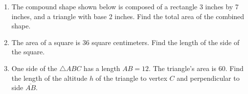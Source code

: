 \documentclass[12pt, twoside]{article}
\begin{document}
\begin{enumerate}
\item The compound shape shown below is composed of a rectangle 3 inches by 7 inches, and a triangle with base 2 inches. Find the total area of the combined shape.
    \vspace{0.5cm} 
    \begin{flushleft}
    \end{flushleft}
        
  \item The area of a square is 36 square centimeters. Find the length of the side of the square. \vspace{3cm}


  \item One side of the $\triangle ABC$ has a length $AB=12$. The triangle's area is 60. Find the length of the altitude $h$ of the triangle to vertex $C$ and perpendicular to side $\overline{AB}$.\\
  
\end{enumerate}
\end{document}
